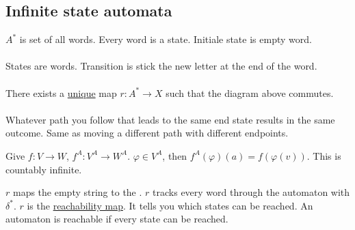 \documentclass[../598comp.tex]{subfiles}
\begin{document}
\subsection{Infinite state automata}
$A^*$ is set of all words. Every word is a state. Initiale state is empty word.
\\\\
States are words. Transition is stick the new letter at the end of the word.
\\\\
There exists a \ul{unique} map $r: A^* \to X$ such that the diagram above commutes.
\\\\
Whatever path you follow that leads to the same end state results in the same outcome. Same as moving a different path with different endpoints.
\begin{note}
  Give $f: V \to W$, $f^A: V^A \to W^A$. $\varphi \in V^A$, then $f^A(\varphi)(a) = f(\varphi(v))$. This is countably infinite.
  \begin{definition}[Reachability]
    $r$ maps the empty string to the . $r$ tracks every word through the automaton with $\delta^*$. $r$ is the \ul{reachability map}. It tells you which states can be reached. An automaton is reachable if every state can be reached.
  \end{definition} 
\end{note} 
\end{document}
